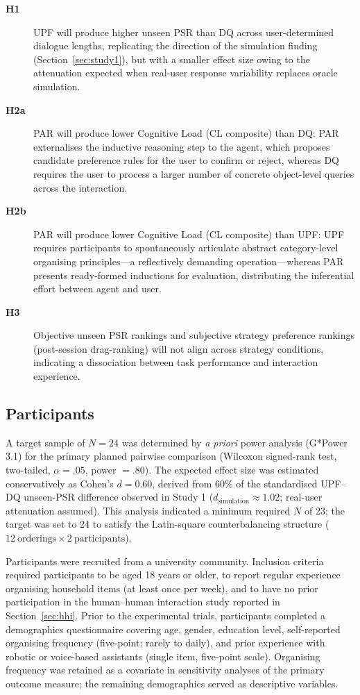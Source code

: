 \documentclass[manuscript,review,anonymous]{acmart}
\begin{document}
\begin{description}
  \item[\textbf{H1}] UPF will produce higher unseen PSR than DQ across user-determined dialogue lengths, replicating the direction of the simulation finding (Section~\ref{sec:study1}), but with a smaller effect size owing to the attenuation expected when real-user response variability replaces oracle simulation.
  \item[\textbf{H2a}] PAR will produce lower Cognitive Load (CL composite) than DQ: PAR externalises the inductive reasoning step to the agent, which proposes candidate preference rules for the user to confirm or reject, whereas DQ requires the user to process a larger number of concrete object-level queries across the interaction.
  \item[\textbf{H2b}] PAR will produce lower Cognitive Load (CL composite) than UPF: UPF requires participants to spontaneously articulate abstract category-level organising principles---a reflectively demanding operation---whereas PAR presents ready-formed inductions for evaluation, distributing the inferential effort between agent and user.
  \item[\textbf{H3}] Objective unseen PSR rankings and subjective strategy preference rankings (post-session drag-ranking) will not align across strategy conditions, indicating a dissociation between task performance and interaction experience.
\end{description}

\subsection{Participants}
\label{sec:study2:participants}

A target sample of $N = 24$ was determined by \textit{a priori} power analysis (G*Power 3.1) for the primary planned pairwise comparison (Wilcoxon signed-rank test, two-tailed, $\alpha = .05$, power $= .80$). The expected effect size was estimated conservatively as Cohen's $d = 0.60$, derived from 60\% of the standardised UPF--DQ unseen-PSR difference observed in Study 1 ($d_{\text{simulation}} \approx 1.02$; real-user attenuation assumed). This analysis indicated a minimum required $N$ of 23; the target was set to 24 to satisfy the Latin-square counterbalancing structure ($12~\text{orderings} \times 2~\text{participants}$).

Participants were recruited from a university community. Inclusion criteria required participants to be aged 18 years or older, to report regular experience organising household items (at least once per week), and to have no prior participation in the human--human interaction study reported in Section~\ref{sec:hhi}. Prior to the experimental trials, participants completed a demographics questionnaire covering age, gender, education level, self-reported organising frequency (five-point: rarely to daily), and prior experience with robotic or voice-based assistants (single item, five-point scale). Organising frequency was retained as a covariate in sensitivity analyses of the primary outcome measure; the remaining demographics served as descriptive variables.
\end{document}
